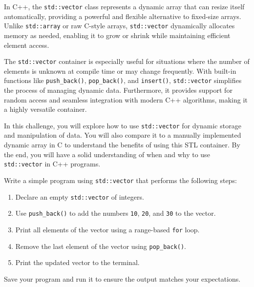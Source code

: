 \begin{challenge}
    \begin{chadescription}
    In C++, the \texttt{std::vector} class represents a dynamic array that can resize itself automatically, providing a powerful and flexible alternative to fixed-size arrays. 
    Unlike \texttt{std::array} or raw C-style arrays, \texttt{std::vector} dynamically allocates memory as needed, enabling it to grow or shrink while maintaining efficient element access.

    The \texttt{std::vector} container is especially useful for situations where the number of elements is unknown at compile time or may change frequently. 
    With built-in functions like \texttt{push_back()}, \texttt{pop_back()}, and \texttt{insert()}, \texttt{std::vector} simplifies the process of managing dynamic data. 
    Furthermore, it provides support for random access and seamless integration with modern C++ algorithms, making it a highly versatile container.

    In this challenge, you will explore how to use \texttt{std::vector} for dynamic storage and manipulation of data. 
    You will also compare it to a manually implemented dynamic array in C to understand the benefits of using this STL container. 
    By the end, you will have a solid understanding of when and why to use \texttt{std::vector} in C++ programs.
    \end{chadescription}

    \begin{task}
        Write a simple program using \texttt{std::vector} that performs the following steps:
        \begin{enumerate}
            \item Declare an empty \texttt{std::vector} of integers.
            \item Use \texttt{push_back()} to add the numbers \texttt{10}, \texttt{20}, and \texttt{30} to the vector.
            \item Print all elements of the vector using a range-based \texttt{for} loop.
            \item Remove the last element of the vector using \texttt{pop_back()}.
            \item Print the updated vector to the terminal.
        \end{enumerate}

        Save your program and run it to ensure the output matches your expectations.


\end{task}
\end{challenge}
